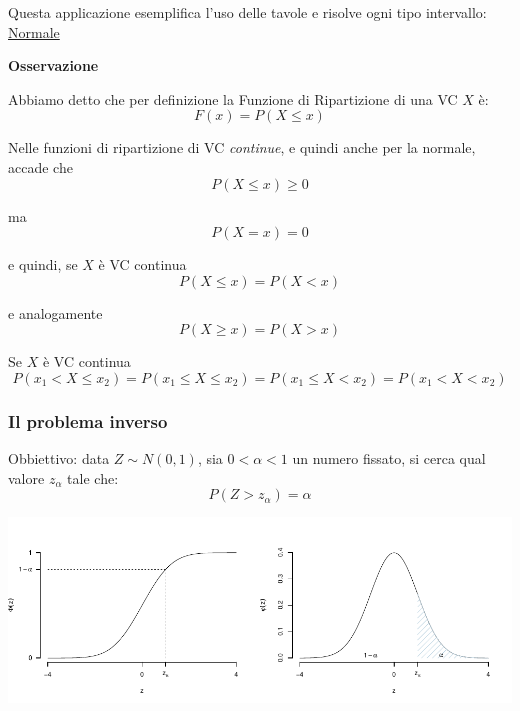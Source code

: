 \documentclass[
  11pt,
]{book}
\theoremstyle{mytheoremstyle}
\theoremstyle{mydefstyle}
\begin{document}
Questa applicazione esemplifica l'uso delle tavole e risolve ogni tipo intervallo: \href{https://patrizio-frederic.shinyapps.io/normale/}{Normale}

\textbf{Osservazione}

Abbiamo detto che per definizione la Funzione di Ripartizione di una VC \(X\) è:
\[F(x)=P(X\leq x)\]

Nelle funzioni di ripartizione di VC \emph{continue}, e quindi anche per la normale, accade che
\[P(X\leq x)\geq 0\]

ma
\[P(X=x)=0\]

e quindi, se \(X\) è VC continua
\[P(X\leq x)=P(X<x)\]

e analogamente
\[P(X\geq x)=P(X>x)\]

Se \(X\) è VC continua
\[P(x_1<X\leq x_2)=P(x_1\leq X \leq x_2)=P(x_1\leq X < x_2)=P(x_1<X<x_2)\]

\subsubsection{Il problema inverso}\label{il-problema-inverso}

Obbiettivo: data \(Z\sim N(0,1)\), sia \(0<\alpha<1\) un numero fissato, si cerca qual valore \(z_\alpha\) tale che:
\[P(Z > z_\alpha)=\alpha\]

\begin{center}\includegraphics{Appunti_di_Statistica_2025_files/figure-latex/07c-Normale-27,-1} \end{center}
\end{document}

